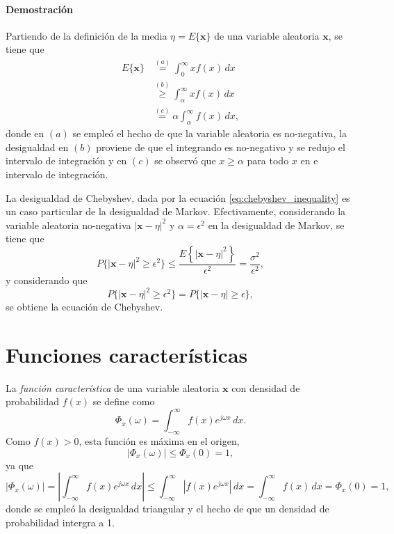 \documentclass[a4paper]{report}
\newcommand{\x}{\mathbf{x}}
\begin{document}
\paragraph{Demostración} Partiendo de la definición de la media \(\eta=E\{\x\}\) de una variable aleatoria \(\x\), se tiene que
\begin{align*}
 E\{\x\}&\overset{(a)}{=}\int_{0}^{\infty}xf(x)\,dx\\
  &\overset{(b)}{\geq}\int_{\alpha}^{\infty}xf(x)\,dx\\
  &\overset{(c)}{=}\alpha\int_{\alpha}^{\infty}f(x)\,dx,
\end{align*}
donde en \((a)\) se empleó el hecho de que la variable aleatoria es no-negativa, la desigualdad en \((b)\) proviene de que el integrando es no-negativo y se redujo el intervalo de integración y en \((c)\) se observó que \(x\geq\alpha\) para todo \(x\) en e intervalo de integración.

La desigualdad de Chebyshev, dada por la ecuación \ref{eq:chebyshev_inequality} es un caso particular de la desigualdad de Markov. Efectivamente, considerando la variable aleatoria no-negativa \(|\x-\eta|^2\) y \(\alpha=\epsilon^2\) en la desigualdad de Markov, se tiene que
\[
 P\{|\x-\eta|^2\geq\epsilon^2\}\leq\frac{E\left\{|\x-\eta|^2\right\}}{\epsilon^2}=\frac{\sigma^2}{\epsilon^2},
\]
y considerando que 
\[
 P\{|\x-\eta|^2\geq\epsilon^2\}=P\{|\x-\eta|\geq\epsilon\},
\]
se obtiene la ecuación de Chebyshev.

\section{Funciones características}

La \emph{función característica} de una variable aleatoria \(\x\) con densidad de probabilidad \(f(x)\) se define como
\begin{equation}\label{eq:characteristic_function}
 \Phi_x(\omega)=\int_{-\infty}^{\infty}f(x)e^{j\omega x}\,dx.
\end{equation}
Como \(f(x)>0\), esta función es máxima en el origen,
\begin{equation}\label{eq:characteristic_function_maximum}
 |\Phi_x(\omega)|\leq\Phi_x(0)=1,
\end{equation}
ya que
\[
 |\Phi_x(\omega)|=\left|\int_{-\infty}^{\infty}f(x)e^{j\omega x}\,dx\right|
   \leq\int_{-\infty}^{\infty}\left|f(x)e^{j\omega x}\right|\,dx
   =\int_{-\infty}^{\infty}f(x)\,dx
   =\Phi_x(0)=1,
\]
donde se empleó la desigualdad triangular y el hecho de que un densidad de probabilidad intergra a 1.
\end{document}
